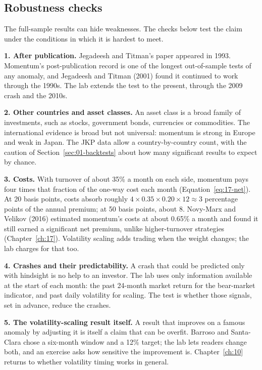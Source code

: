 \subsection{Robustness checks}
\label{sec:05-stress}

The full-sample results can hide weaknesses. The checks below test the claim under the conditions in which it is hardest to meet.

\textbf{1. After publication.} Jegadeesh and Titman's paper appeared in 1993. Momentum's post-publication record is one of the longest out-of-sample tests of any anomaly, and Jegadeesh and Titman (2001) found it continued to work through the 1990s. The lab extends the test to the present, through the 2009 crash and the 2010s.

\textbf{2. Other countries and asset classes.} An asset class is a broad family of investments, such as stocks, government bonds, currencies or commodities. The international evidence is broad but not universal: momentum is strong in Europe and weak in Japan. The JKP data allow a country-by-country count, with the caution of Section~\ref{sec:01-backtests} about how many significant results to expect by chance.

\textbf{3. Costs.} With turnover of about 35\% a month on each side, momentum pays four times that fraction of the one-way cost each month (Equation~\eqref{eq:17-net}). At 20 basis points, costs absorb roughly $4 \times 0.35 \times 0.20 \times 12 \approx 3$ percentage points of the annual premium; at 50 basis points, about 8. Novy-Marx and Velikov (2016) estimated momentum's costs at about 0.65\% a month and found it still earned a significant net premium, unlike higher-turnover strategies (Chapter~\ref{ch:17}). Volatility scaling adds trading when the weight changes; the lab charges for that too.

\textbf{4. Crashes and their predictability.} A crash that could be predicted only with hindsight is no help to an investor. The lab uses only information available at the start of each month: the past 24-month market return for the bear-market indicator, and past daily volatility for scaling. The test is whether those signals, set in advance, reduce the crashes.

\textbf{5. The volatility-scaling result itself.} A result that improves on a famous anomaly by adjusting it is itself a claim that can be overfit. Barroso and Santa-Clara chose a six-month window and a 12\% target; the lab lets readers change both, and an exercise asks how sensitive the improvement is. Chapter~\ref{ch:10} returns to whether volatility timing works in general.

